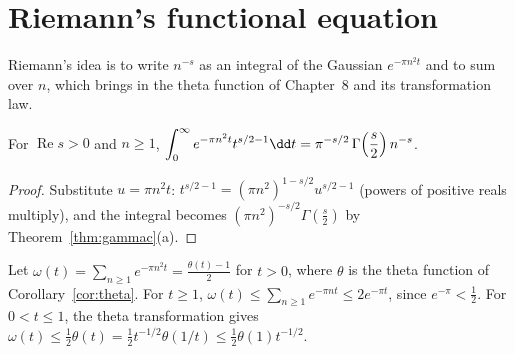 \section{Riemann's functional equation}

Riemann's idea is to write $n^{-s}$ as an integral of the Gaussian $e^{-\pi n^2t}$ and to sum over $n$, which brings in the theta function of
Chapter~8 and its transformation law.

\begin{lemma}\label{lem:mellingauss}
For $\operatorname{Re}s>0$ and $n\ge1$, $\displaystyle\int_0^\infty e^{-\pi n^2t}t^{s/2-1}\dd t=\pi^{-s/2}\,\Gamma\Bigl(\frac s2\Bigr)\,n^{-s}$.
\end{lemma}
\begin{proof}
Substitute $u=\pi n^2t$: $t^{s/2-1}=(\pi n^2)^{1-s/2}u^{s/2-1}$ (powers of positive reals multiply), and the integral becomes $(\pi n^2)^{-s/2}\Gamma(\frac s2)$ by
Theorem~\ref{thm:gammac}(a).
\end{proof}

Let $\omega(t)=\sum_{n\ge1}e^{-\pi n^2t}=\frac{\theta(t)-1}2$ for $t>0$, where $\theta$ is the theta function of Corollary~\ref{cor:theta}. For $t\ge1$, $\omega(t)\le\sum_{n\ge1}e^{-\pi nt}\le2e^{-\pi t}$,
since $e^{-\pi}<\frac12$. For $0<t\le1$, the theta transformation gives $\omega(t)\le\frac12\theta(t)=\frac12t^{-1/2}\theta(1/t)\le\frac12\theta(1)t^{-1/2}$.

